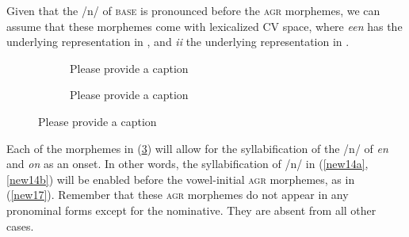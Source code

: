 \documentclass[output=paper]{langscibook}
\begin{document}
Given that the /n/ of \textsc{base} is pronounced before the \textsc{agr} morphemes, we can assume that these morphemes come with lexicalized CV space, where \textit{een} has the underlying representation in , and \emph{ii} the underlying representation in .

\begin{figure}
    \centering
    \begin{subfigure}{.4\textwidth}
        \centering 
        \caption{\color{red}Please provide a caption}
        \label{new16a}
    \end{subfigure}
    \begin{subfigure}{.4\textwidth}
        \centering 
        \caption{\color{red}Please provide a caption}
        \label{new16b}
    \end{subfigure}
    \caption{\color{red}Please provide a caption}
    \label{new16}
\end{figure}

Each of the morphemes in (\ref{new16}) will allow for the syllabification of the /n/ of \textit{en} and \textit{on} as an onset. In other words, the syllabification of /n/ in (\ref{new14a}, \ref{new14b}) will be enabled before the vowel-initial \textsc{agr} morphemes, as in (\ref{new17}). Remember that these \textsc{agr} morphemes do not appear in any pronominal forms except for the nominative. They are absent from all other cases. 
\end{document}
